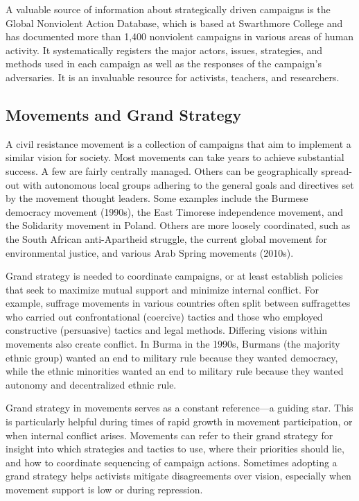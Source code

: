 \documentclass[twoside,a4paper,12pt,fleqn,openany]{extbook}
\begin{document}
A valuable source of information about strategically driven campaigns is the Global Nonviolent Action Database, which is based at Swarthmore College and has documented more than 1,400 nonviolent campaigns in various areas of human activity. It systematically registers the major actors, issues, strategies, and methods used in each campaign as well as the responses of the campaign’s adversaries. It is an invaluable resource for activists, teachers, and researchers.

\subsection*{Movements and Grand Strategy}

A civil resistance movement is a collection of campaigns that aim to implement a similar vision for society. Most movements can take years to achieve substantial success. A few are fairly centrally managed. Others can be geographically spread-out with autonomous local groups adhering to the general goals and directives set by the movement thought leaders. Some examples include the Burmese democracy movement (1990s), the East Timorese independence movement, and the Solidarity movement in Poland. Others are more loosely coordinated, such as the South African anti-Apartheid struggle, the current global movement for environmental justice, and various Arab Spring movements (2010s).

Grand strategy is needed to coordinate campaigns, or at least establish policies that seek to maximize mutual support and minimize internal conflict. For example, suffrage movements in various countries often split between suffragettes who carried out confrontational (coercive) tactics and those who employed constructive (persuasive) tactics and legal methods. Differing visions within movements also create conflict. In Burma in the 1990s, Burmans (the majority ethnic group) wanted an end to military rule because they wanted democracy, while the ethnic minorities wanted an end to military rule because they wanted autonomy and decentralized ethnic rule.

Grand strategy in movements serves as a constant reference—a guiding star. This is particularly helpful during times of rapid growth in movement participation, or when internal conflict arises. Movements can refer to their grand strategy for insight into which strategies and tactics to use, where their priorities should lie, and how to coordinate sequencing of campaign actions. Sometimes adopting a grand strategy helps activists mitigate disagreements over vision, especially when movement support is low or during repression.
\end{document}
